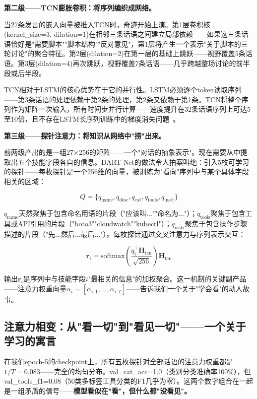 \documentclass[twocolumn,10.5pt]{ctexart}
\begin{document}
\textbf{第二级——TCN膨胀卷积：将序列编织成网络。}

当27条发言的嵌入向量被推入TCN时，奇迹开始上演。第1层卷积核(kernel\_size=3, dilation=1)在相邻三条话语之间建立局部依赖——如果这三条话语恰好是"需要脚本""脚本结构""反对意见"，第1层将产生一个表示"关于脚本的三轮讨论"的聚合特征。第2层(dilation=2)在第一层的基础上跳跃——视野覆盖5条话语。第3层(dilation=4)再次跳跃，视野覆盖7条话语——几乎跨越整场讨论的前半段或后半段。

TCN相对于LSTM的核心优势在于它的并行性。LSTM必须逐个token读取序列——第3条话语的处理依赖于第2条的处理，第2条又依赖于第1条。TCN将整个序列作为矩阵一次输入，所有时间步并行计算——速度提升在32条话语序列上可达5至10倍，且不存在LSTM长序列训练中的梯度消失问题~\cite{bai2018tcn}。

\textbf{第三级——探针注意力：将知识从网络中"捞"出来。}

前两级产出的是一组27×256的矩阵——一个"对话的抽象表示"。现在需要从中提取出五个技能字段各自的信息。DART-Net的做法令人拍案叫绝：引入5枚可学习的探针——每枚探针是一个256维的向量，被训练为"看向"序列中与某个具体字段相关的区域：

\begin{equation}
Q = \{q_{\text{name}}, q_{\text{desc}}, q_{\text{cat}}, q_{\text{tools}}, q_{\text{instr}}\}
\label{eq:probes_passionate}
\end{equation}

$q_{\text{name}}$天然聚焦于包含命名用语的片段（"应该叫...""命名为..."）；$q_{\text{tools}}$聚焦于包含工具或API引用的片段（"boto3""cloudwatch""kubectl"）；$q_{\text{instr}}$聚焦于包含操作步骤描述的片段（"先...然后...最后..."）。每枚探针通过交叉注意力与序列表示交互：

\begin{equation}
\mathbf{r}_i = \text{softmax}\left(\frac{q_i^\top \mathbf{H}_{\text{tcn}}}{\sqrt{256}}\right) \mathbf{H}_{\text{tcn}}
\label{eq:cross_attn_passionate}
\end{equation}

输出$\mathbf{r}_i$是序列中与技能字段$i$"最相关的信息"的加权聚合。这一机制的关键副产品——注意力权重向量$\alpha_i = [\alpha_{i,1}, \ldots, \alpha_{i,T}]$——告诉我们一个关于"学会看"的动人故事。

\subsection{注意力相变：从"看一切"到"看见一切"——一个关于学习的寓言}

在我们epoch-5的checkpoint上，所有五枚探针对全部话语的注意力权重都是$1/T = 0.083$——完全的均匀分布。val\_cat\_acc=1.0（类别分类准确率100\%），但val\_tools\_f1=0.08（50类多标签工具分类的F1几乎为零）。这两个数字组合在一起是一组矛盾的信号——\textbf{模型看似在"看"，但什么都"没看见"。}
\end{document}
